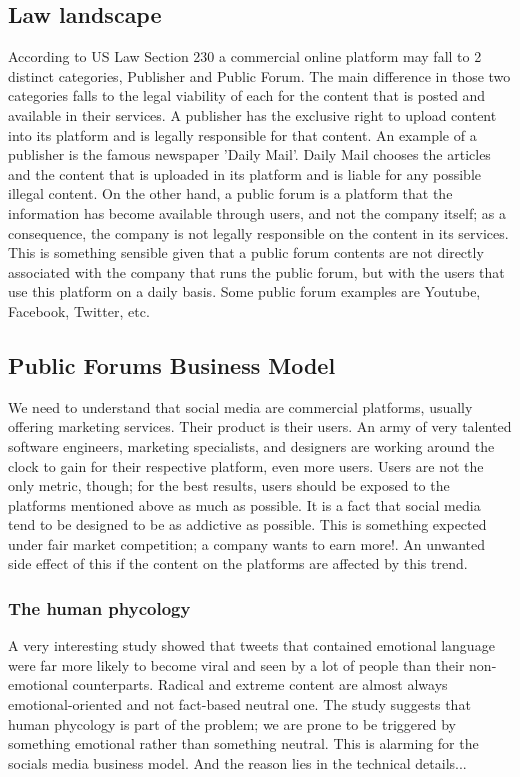 \documentclass[openany]{article}
\begin{document}
	\subsection*{Law landscape}
		According to US Law Section 230\cite{S230} a commercial online platform may fall to 2 distinct categories, Publisher and Public Forum. 
		The main difference in those two categories falls to the legal viability of each for the content that is posted and available in their services. 
		A publisher has the exclusive right to upload content into its platform and is legally responsible for that content. 
		An example of a publisher is the famous newspaper 'Daily Mail'. Daily Mail chooses the articles and the content that is uploaded in its platform 
		and is liable for any possible illegal content. On the other hand, a public forum is a platform that the information has become available 
		through users, and not the company itself; as a consequence, the company is not legally responsible on the content in its services. 
		This is something sensible given that a public forum contents are not directly associated with the company that runs the public forum, 
		but with the users that use this platform on a daily basis. Some public forum examples are Youtube, Facebook, Twitter, etc.
	\subsection*{Public Forums Business Model}
		We need to understand that social media are commercial platforms, usually offering marketing services. Their product is their users. 
		An army of very talented software engineers, marketing specialists, and designers are working around the clock to gain for their respective 
		platform, even more users. Users are not the only metric, though; for the best results, users should be exposed to the platforms mentioned 
		above as much as possible. It is a fact that social media tend to be designed to be as addictive as possible\cite{social-media-addictive-1,
			social-media-addictive-2}. This is something expected under fair market competition; a company wants to earn more!. 
		An unwanted side effect of this if the content on the platforms are affected by this trend. 
	\subsubsection*{The human phycology}
		A very interesting study\cite{emotional-tweets} showed that tweets that contained emotional language were far more likely to become viral 
		and seen by a lot of people than their non-emotional counterparts. Radical and extreme content are almost always emotional-oriented and not 
		fact-based neutral one. The study suggests that human phycology is part of the problem; we are prone to be triggered by something 
		emotional rather than something neutral. This is alarming for the socials media business model. And the reason lies in the technical details...
\end{document}
